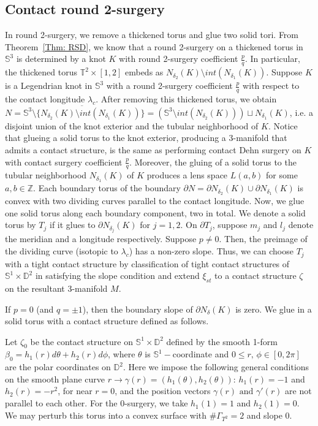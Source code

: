 \documentclass{amsart}
\theoremstyle{plain}
\theoremstyle{remark}
\theoremstyle{definition}
\newcommand{\s}{\mathbb{S}}
\newcommand{\D}{\mathbb{D}}
\newcommand{\dd}{\partial}
\begin{document}
\subsection{Contact round 2-surgery}\label{subsec: CR2S}
In round 2-surgery, we remove a thickened torus and glue two solid tori. 
From Theorem~\ref{Thm: RSD}, we know that a round 2-surgery on a thickened torus in $\s^3$ is determined by a knot $K$ with round 2-surgery coefficient $\frac{p}{q}$. 
In particular, the thickened torus $\mathbb{T}^2 \times [1,2]$ embeds as $ N_{\delta_2}(K)\setminus int(N_{\delta_1}(K))$. 
Suppose $K$ is a Legendrian knot in $\s^3$ with a round 2-surgery coefficient $\frac{p}{q}$ with respect to the contact longitude $\lambda_c$. 
After removing this thickened torus, we obtain $N= \overline{\s^3 \setminus \{N_{\delta_2}(K)\setminus int(N_{\delta_1}(K))}\}$$= (\s^3 \setminus int(N_{\delta_2}(K))) \sqcup N_{\delta_1}(K)$, i.e. a disjoint union of the knot exterior and the tubular neighborhood of $K$. 
Notice that glueing a solid torus to the knot exterior, producing a 3-manifold that admits a contact structure, is the same as performing contact Dehn surgery on $K$ with contact surgery coefficient $\frac{p}{q}$.
Moreover, the gluing of a solid torus to the tubular neighborhood $N_{\delta_1}(K)$ of $K$ produces a lens space $L(a,b)$ for some $a, b \in \mathbb{Z}$.
Each boundary torus of the boundary $\dd N = \dd N_{\delta_2}(K) \cup \dd N_{\delta_1}(K)$ is convex with two dividing curves parallel to the contact longitude.
Now, we glue one solid torus along each boundary component, two in total.
We denote a solid torus by $T_j$ if it glues to $\dd N_{\delta_j}(K)$ for $j=1,2$. 
On $\dd T_j$, suppose $m_j$ and $l_j$ denote the meridian and a longitude respectively.  
Suppose $p\neq 0$. Then, the preimage of the dividing curve (isotopic to $\lambda_c$) has a non-zero slope. 
Thus, we can choose $T_j$ with a tight contact structure by classification of tight contact structures of $\s^1 \times \D^2$ in \cite{KH} satisfying the slope condition and extend $\xi_{st}$ to a contact structure $\zeta$ on the resultant 3-manifold $M$.

If $p= 0$ (and $q=\pm 1$), then the boundary slope of $\dd N_{\delta}(K)$ is zero. 
We glue in a solid torus with a contact structure defined as follows. 

Let $\zeta_0$ be the contact structure on $\s^1\times \D^2$ defined by the smooth 1-form $\beta_0= h_1(r)d\theta+ h_2(r) d\phi$, where  $\theta$ is $\s^1-$coordinate and $0\leq r, \,  \phi\in [0,2\pi]$ are the polar coordinates on $\D^2$. 
Here we impose the following general conditions on the smooth plane curve $r \to \gamma(r)= (h_1(\theta), h_2(\theta))$: 
$h_1(r)= -1$ and $h_2(r)= -r^2$, for near $r=0 $, and the position vectors $\gamma(r) \text{ and } \gamma'(r)$ are not parallel to each other. 
For the $0$-surgery,  we take $h_1(1)=1 $ and $h_2(1)= 0$. 
We may perturb this torus into a convex surface with $\# \Gamma_{T^2}=2$ and slope $0$.
\end{document}
